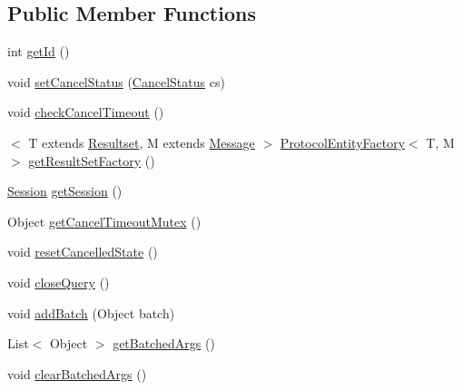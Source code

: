 \subsection*{Public Member Functions}
\begin{DoxyCompactItemize}
\item 
int \mbox{\hyperlink{interfacecom_1_1mysql_1_1cj_1_1_query_a29f450bbae1063765d434e3b89bdd26e}{get\+Id}} ()
\item 
void \mbox{\hyperlink{interfacecom_1_1mysql_1_1cj_1_1_query_ad88d55a91d45f0e133f0ffe7a279b258}{set\+Cancel\+Status}} (\mbox{\hyperlink{enumcom_1_1mysql_1_1cj_1_1_query_1_1_cancel_status}{Cancel\+Status}} cs)
\item 
void \mbox{\hyperlink{interfacecom_1_1mysql_1_1cj_1_1_query_add91f39e25b2687d5ae8637d59e470f5}{check\+Cancel\+Timeout}} ()
\item 
$<$ T extends \mbox{\hyperlink{interfacecom_1_1mysql_1_1cj_1_1protocol_1_1_resultset}{Resultset}}, M extends \mbox{\hyperlink{interfacecom_1_1mysql_1_1cj_1_1protocol_1_1_message}{Message}} $>$ \mbox{\hyperlink{interfacecom_1_1mysql_1_1cj_1_1protocol_1_1_protocol_entity_factory}{Protocol\+Entity\+Factory}}$<$ T, M $>$ \mbox{\hyperlink{interfacecom_1_1mysql_1_1cj_1_1_query_a65a08bc19f00ca6ae30fa9d7666e9f51}{get\+Result\+Set\+Factory}} ()
\item 
\mbox{\hyperlink{interfacecom_1_1mysql_1_1cj_1_1_session}{Session}} \mbox{\hyperlink{interfacecom_1_1mysql_1_1cj_1_1_query_ad9657ad6282e8cccd264dccb9b1204a5}{get\+Session}} ()
\item 
Object \mbox{\hyperlink{interfacecom_1_1mysql_1_1cj_1_1_query_af99b8945b78c6f6cec21d9a81e227d1e}{get\+Cancel\+Timeout\+Mutex}} ()
\item 
void \mbox{\hyperlink{interfacecom_1_1mysql_1_1cj_1_1_query_a382965ca9799730bbfd58c83facd98b5}{reset\+Cancelled\+State}} ()
\item 
void \mbox{\hyperlink{interfacecom_1_1mysql_1_1cj_1_1_query_a5808add7bd2bffa44c7532995b16e442}{close\+Query}} ()
\item 
void \mbox{\hyperlink{interfacecom_1_1mysql_1_1cj_1_1_query_a726941dcc741acae509b16f14730966a}{add\+Batch}} (Object batch)
\item 
List$<$ Object $>$ \mbox{\hyperlink{interfacecom_1_1mysql_1_1cj_1_1_query_af927782ce04741b0b0d3447e9b4f2a08}{get\+Batched\+Args}} ()
\item 
void \mbox{\hyperlink{interfacecom_1_1mysql_1_1cj_1_1_query_a72ab11f1338a67459c15b31d1e808b14}{clear\+Batched\+Args}} ()
\item 

\end{DoxyCompactItemize}
